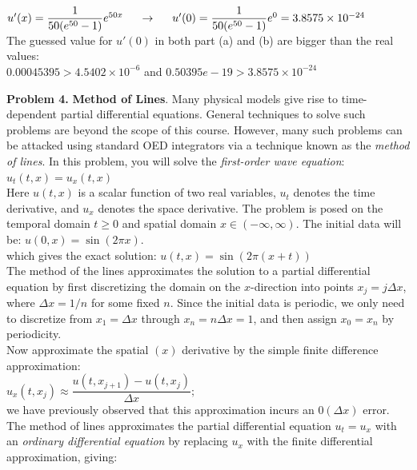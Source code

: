 \documentclass[14pt,a4paper]{article}
\begin{document}
\begin{enumerate}
	\hspace*{2.5cm} $u'(x) = \dfrac{1}{50(e^{50}-1)}e^{50x} \hspace{0.5cm} \rightarrow \hspace{0.5cm} u'(0) = \dfrac{1}{50(e^{50}-1)}e^0 = 3.8575 \times 10^{-24} $ \\
	The guessed value for $u'(0)$ in both part (a) and (b) are bigger than the real values:\\
	\hspace*{1cm} $ 0.00045395 > 4.5402 \times 10^{-6} $ \hspace{0.3cm} and \hspace{0.3cm} $ 0.50395e-19 >  3.8575 \times 10^{-24} $ \\
\end{enumerate}

\label{Problem 4}
\large\textbf{Problem 4.} \textbf{Method of Lines}. Many physical models give rise to time-dependent partial differential equations. General techniques to solve such problems are beyond the scope of this course. However, many such problems can be attacked using standard OED integrators via a technique known as the \textit{method of lines}. In this problem, you will solve the \textit{first-order wave equation}: $u_t(t,x) = u_x(t,x)$\\
Here $u(t,x)$ is a scalar function of two real variables, $u_t$ denotes the time derivative, and $u_x$ denotes the space derivative. The problem is posed on the temporal domain $t \geq 0$ and spatial domain $x \in (-\infty, \infty)$. The initial data will be: $u(0,x) = \sin(2\pi x)$.\\
which gives the exact solution: $u(t,x) = \sin(2\pi(x+t))$\\
The method of the lines approximates the solution to a partial differential equation by first discretizing the domain on the $x$-direction into points $x_j = j\Delta x$, where $\Delta x = 1/n$ for some fixed $n$. Since the initial data is periodic, we only need to discretize from $x_1 = \Delta x$ through $x_n = n\Delta x = 1$, and then assign $x_0 = x_n$ by periodicity.\\
Now approximate the spatial $(x)$ derivative by the simple finite difference approximation:\\
\hspace*{4cm} $u_x(t,x_j) \approx \dfrac{u(t,x_{j+1}) - u(t,x_j)}{\Delta x}; $ \\
we have previously observed that this approximation incurs an $0(\Delta x)$ error. The method of lines approximates the partial differential equation $u_t = u_x$ with an \textit{ordinary differential equation} by replacing $u_x$ with the finite differential approximation, giving:\\
\end{document}
